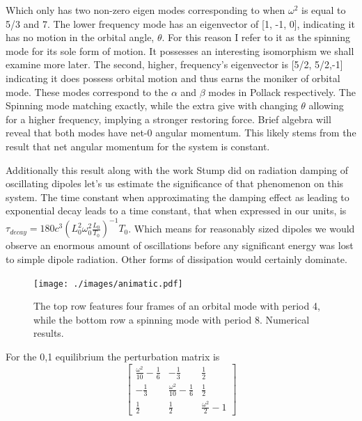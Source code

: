 \documentclass[prbg,preprint]{revtex4-1}
\begin{document}
Which only has two non-zero eigen modes corresponding to when $\omega^2$ is equal to 5/3 and 7. The lower frequency mode has an eigenvector of [1, -1, 0], indicating it has no motion in the orbital angle, $\theta$. For this reason I refer to it as the spinning mode for its sole form of motion. It possesses an interesting isomorphism we shall examine more later. The second, higher, frequency's eigenvector is [5/2, 5/2,-1] indicating it does possess orbital motion and thus earns the moniker of orbital mode. These modes correspond to the $\alpha$ and $\beta$ modes in Pollack\cite{doi:10.1139/p96-151} respectively. The Spinning mode matching exactly, while the extra give with changing $\theta$ allowing for a higher frequency, implying a stronger restoring force. Brief algebra will reveal that both modes have net-0 angular momentum. This likely stems from the result that net angular momentum for the system is constant.

Additionally this result along with the work Stump did on radiation damping of oscillating dipoles \cite{Stump:1997aa} let's us estimate the significance of that phenomenon on this system. The time constant when approximating the damping effect as leading to exponential decay leads to a time constant, that when expressed in our units, is 
$\tau_{decay}=180 c^3 (L_0^2 \omega_0^2\frac{L_0}{T_0})^{-1}T_0$. Which means for reasonably sized dipoles we would observe an enormous amount of oscillations before any significant energy was lost to simple dipole radiation. Other forms of dissipation would certainly dominate.


\begin{figure}[h]
	\texttt{[image: ./images/animatic.pdf]} 

  \caption{The top row features four frames of an orbital mode with period 4, while the bottom row a spinning mode with period 8. Numerical results.}
\end{figure}

For the 0,1 equilibrium the perturbation matrix is 
\begin{equation}
	\left[\begin{matrix}\frac{\omega^{2}}{10} - \frac{1}{6} & - \frac{1}{3} & \frac{1}{2}\\
	- \frac{1}{3} & \frac{\omega^{2}}{10} - \frac{1}{6} & \frac{1}{2}\\
	\frac{1}{2} & \frac{1}{2} & \frac{\omega^{2}}{2} - 1\end{matrix}\right]\end{equation}
\end{document}
